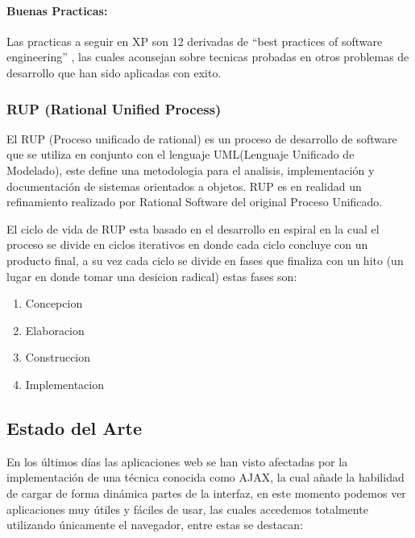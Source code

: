 \paragraph{Buenas Practicas:} Las practicas a seguir en XP son 12 \cite{xp_practices} derivadas de ``best practices of software engineering'' \cite{best_practices}, las cuales aconsejan sobre tecnicas probadas en otros problemas de desarrollo que han sido aplicadas con exito.


\subsubsection*{RUP (Rational Unified Process) \cite{rup}}

El RUP (Proceso unificado de rational) es un proceso de desarrollo de software que se utiliza en conjunto con el lenguaje UML(Lenguaje Unificado de Modelado), este define una metodologia para el analisis, implementación y documentación de sistemas orientados a objetos. RUP es en realidad un refinamiento realizado por Rational Software del original Proceso Unificado.

El ciclo de vida de RUP esta basado en el desarrollo en espiral en la cual el proceso se divide en ciclos iterativos en donde cada ciclo concluye con un producto final, a su vez cada ciclo se divide en fases que finaliza con un hito (un lugar en donde tomar una desicion radical) estas fases son: 

\begin{enumerate}

	\item Concepcion
	\item Elaboracion
	\item Construccion
	\item Implementacion

\end{enumerate}


\subsection{Estado del Arte}

En los últimos días las aplicaciones web se han visto afectadas por la implementación de una técnica conocida como AJAX, la cual añade la habilidad de cargar de forma dinámica partes de la interfaz, en este momento podemos ver aplicaciones muy útiles y fáciles de usar, las cuales accedemos totalmente utilizando únicamente el navegador, entre estas se destacan:


